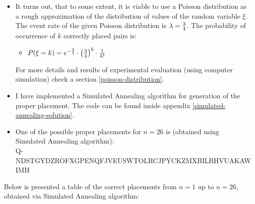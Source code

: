 \documentclass{article}
\begin{document}
\begin{itemize}
	\item It turns out, that to some extent, it is viable to use a Poisson distribution as a rough approximation of the distribution of values of the random variable $\xi$. The event rate of the given Poisson distribution is $\lambda = {3 \over 4}$. The probability of occurrence of $k$ correctly placed pairs is:
		\begin{itemize}
			\item $P(\xi = k) = e^{-{3 \over 4}} \cdot \left({3 \over 4}\right)^k \cdot {1 \over k!}$
		\end{itemize}
	For more details and results of experimental evaluation (using computer simulation) check a section \ref{poisson-distribution}.
	
	\item I have implemented a Simulated Annealing algorithm for generation of the proper placement. The code can be found inside appendix \ref{simulated-annealing-solution}.
	
	\item One of the possible proper placements for $n=26$ is (obtained using Simulated Annealing algorithm): \\
	Q-NDSTGYDZROFXGPENQFJVEUSWTOLRCJPYCKZMXBILBHVUAKAWIMH
	
\end{itemize}

Below is presented a table of the correct placements from $n = 1$ up to $n = 26$, obtained via Simulated Annealing algorithm: \\
\end{document}
